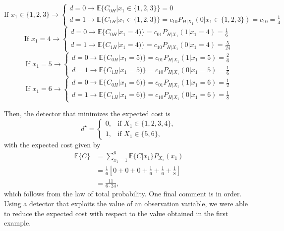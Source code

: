 \begin{solution}
\begin{itemize}
    $$\text{If } x_1 \in \{1,2,3\} \rightarrow \left\{\begin{array}{l} d=0 \rightarrow \mathbb{E}\{C_{0H}|x_1\in \{1,2,3\}\} = 0 \\ d=1 \rightarrow \mathbb{E}\{C_{1H}|x_1\in \{1,2,3\}\} = c_{10} P_{H|X_1}(0|x_1\in \{1,2,3\}) = c_{10} = \frac{1}{4}\end{array}\right.$$
    $$\text{If } x_1 =4 \rightarrow \left\{\begin{array}{l} d=0 \rightarrow \mathbb{E}\{C_{0H}|x_1=4)\} = c_{01} P_{H|X_1}(1|x_1=4) = \frac{1}{6} \\ d=1 \rightarrow \mathbb{E}\{C_{1H}|x_1=4)\} = c_{10} P_{H|X_1}(0|x_1=4) = \frac{5}{24}\end{array}\right.$$
    $$\text{If } x_1 =5 \rightarrow \left\{\begin{array}{l} d=0 \rightarrow \mathbb{E}\{C_{0H}|x_1=5)\} = c_{01} P_{H|X_1}(1|x_1=5) = \frac{2}{6} \\ d=1 \rightarrow \mathbb{E}\{C_{1H}|x_1=5)\} = c_{10} P_{H|X_1}(0|x_1=5) = \frac{1}{6}\end{array}\right.$$
    $$\text{If } x_1 =6 \rightarrow \left\{\begin{array}{l} d=0 \rightarrow \mathbb{E}\{C_{0H}|x_1=6)\} = c_{01} P_{H|X_1}(1|x_1=6) = \frac{1}{2} \\ d=1 \rightarrow \mathbb{E}\{C_{1H}|x_1=6)\} = c_{10} P_{H|X_1}(0|x_1=6) = \frac{1}{8}\end{array}\right.$$
    
    Then, the detector that minimizes the expected cost is
   \begin{equation*}
   d^\star = \begin{cases}  0, & \text{if } X_1 \in \{1,2,3,4\}, \\ 1, & \text{if } X_1 \in \{5, 6\},
   \end{cases}
   \end{equation*}
    with the expected cost given by
    \begin{align*}
        \mathbb{E}\{C\} & = \sum_{x_1=1}^6 \mathbb{E}\{C | x_1\} P_{X_1}(x_1) \\ &= \frac{1}{6}[0+ 0 +0 + \frac{1}{6} + \frac{1}{6} + \frac{1}{8}] \\ &= \frac{11}{6\cdot 24},
    \end{align*}
    which follows from the law of total probability. One final comment is in order. Using a detector that exploits the value of an observation variable, we were able to reduce the expected cost with respect to the value obtained in the first example.
    
\end{itemize}

\end{solution}

